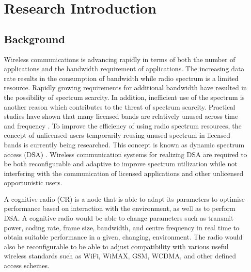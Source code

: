 \chapter{Research Introduction}
\label{chap:introduction}

\section{Background}

Wireless communications is advancing rapidly in terms of both the number of applications  and the bandwidth requirement of applications.
The increasing data rate results in the consumption of bandwidth while radio spectrum is a limited resource.
Rapidly growing requirements for additional bandwidth have resulted in the possibility of spectrum scarcity. 
In addition, inefficient use of the spectrum is another reason which contributes to the threat of spectrum scarcity. 
Practical studies have shown that many licensed bands are relatively unused across time and frequency \cite{FCC2002}. 
To improve the efficiency of using radio spectrum resources, the concept of unlicensed users temporarily reusing unused spectrum in licensed bands is currently being researched.
This concept is known as dynamic spectrum access (DSA) \cite{Minden}.
Wireless communication systems for realizing DSA are required to be both reconfigurable and adaptive to improve spectrum utilization while not interfering with the communication of licensed applications and other unlicensed opportunistic users.

A cognitive radio (CR) is a node that is able to adapt its parameters to optimise performance based on interaction with the environment, as well as to perform DSA. 
A cognitive radio would be able to change parameters such as transmit power, coding rate, frame size, bandwidth, and centre frequency in real time to obtain suitable performance in a given, changing, environment.
The radio would also be reconfigurable to be able to adjust compatibility with various useful wireless standards such as WiFi, WiMAX, GSM, WCDMA, and other defined access schemes.

